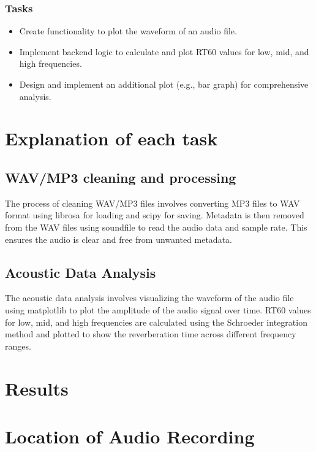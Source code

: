 \documentclass[11pt]{article}
\begin{document}
\subsubsection{Tasks}
\begin{itemize}
    \item Create functionality to plot the waveform of an audio file.
    \item Implement backend logic to calculate and plot RT60 values for low, mid, and high frequencies.
    \item Design and implement an additional plot (e.g., bar graph) for comprehensive analysis.
\end{itemize}
\section{Explanation of each task}

\subsection{WAV/MP3 cleaning and processing}

The process of cleaning WAV/MP3 files involves converting MP3 files to WAV 
format using librosa for loading and scipy for saving. Metadata is then removed from the 
WAV files using soundfile to read the audio data and sample rate. This ensures the audio is clear 
and free from unwanted metadata.

\subsection{Acoustic Data Analysis}

The acoustic data analysis involves visualizing the waveform of the audio file using matplotlib
to plot the amplitude of the audio signal over time. RT60 values for low, mid, and high frequencies
are calculated using the Schroeder integration method and plotted to show the reverberation time
across different frequency ranges.

\section{Results}

\section{Location of Audio Recording}
\end{document}
